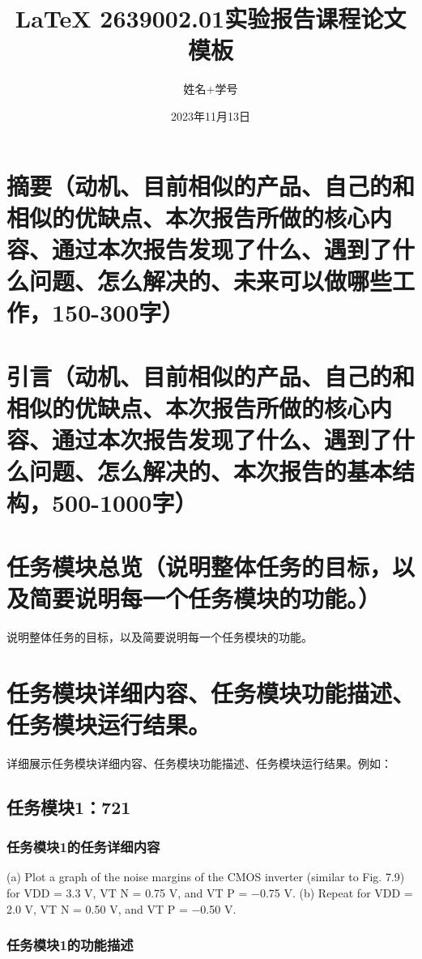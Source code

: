 \documentclass[lang=cn,10pt]{elegantbook}
\title{\LaTeX{} 2639002.01实验报告课程论文模板}
\author{\color{red}姓名+学号}
\institute{Elegant\LaTeX{} Program}
\date{2023年11月13日}
\begin{document}
\maketitle
\frontmatter

\tableofcontents

\mainmatter

\chapter{摘要（动机、目前相似的产品、自己的和相似的优缺点、本次报告所做的核心内容、通过本次报告发现了什么、遇到了什么问题、怎么解决的、未来可以做哪些工作，150-300字）}

\chapter{引言（动机、目前相似的产品、自己的和相似的优缺点、本次报告所做的核心内容、通过本次报告发现了什么、遇到了什么问题、怎么解决的、本次报告的基本结构，500-1000字）}

\chapter{任务模块总览（说明整体任务的目标，以及简要说明每一个任务模块的功能。）}

说明整体任务的目标，以及简要说明每一个任务模块的功能。

\chapter{任务模块详细内容、任务模块功能描述、任务模块运行结果。}

详细展示任务模块详细内容、任务模块功能描述、任务模块运行结果。例如：

\section{任务模块1：721}

\subsection{任务模块1的任务详细内容}

(a) Plot a graph of the noise margins of the CMOS
inverter (similar to Fig. 7.9) for VDD = 3.3 V,
VT N = 0.75 V, and VT P = −0.75 V. (b) Repeat
for VDD = 2.0 V, VT N = 0.50 V, and VT P =
−0.50 V.

\cite{ltc7890module}

\subsection{任务模块1的功能描述}
\end{document}
